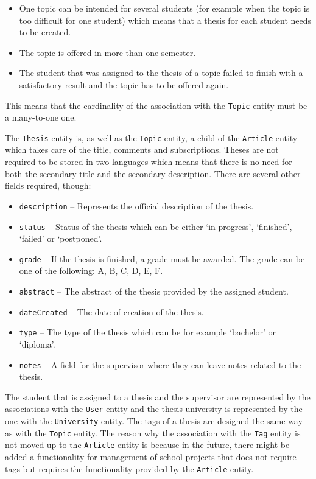 \begin{itemize}
    \item One topic can be intended for several students (for example when the topic is too difficult for one student) which means that a thesis for each student needs to be created.
    \item The topic is offered in more than one semester.
    \item The student that was assigned to the thesis of a topic failed to finish with a satisfactory result and the topic has to be offered again.
\end{itemize}

This means that the cardinality of the association with the \texttt{Topic} entity must be a many-to-one one.

The \texttt{Thesis} entity is, as well as the \texttt{Topic} entity, a child of the \texttt{Article} entity which takes care of the title, comments and subscriptions. Theses are not required to be stored in two languages which means that there is no need for both the secondary title and the secondary description. There are several other fields required, though:

\begin{itemize}
    \item \texttt{description} -- Represents the official description of the thesis.
    \item \texttt{status} -- Status of the thesis which can be either `in progress', `finished', `failed' or `postponed'.
    \item \texttt{grade} -- If the thesis is finished, a grade must be awarded. The grade can be one of the following: A, B, C, D, E, F.
    \item \texttt{abstract} -- The abstract of the thesis provided by the assigned student.
    \item \texttt{dateCreated} -- The date of creation of the thesis.
    \item \texttt{type} -- The type of the thesis which can be for example `bachelor' or `diploma'.
    \item \texttt{notes} -- A field for the supervisor where they can leave notes related to the thesis.
\end{itemize}

The student that is assigned to a thesis and the supervisor are represented by the associations with the \texttt{User} entity and the thesis university is represented by the one with the \texttt{University} entity. The tags of a thesis are designed the same way as with the \texttt{Topic} entity. The reason why the association with the \texttt{Tag} entity is not moved up to the \texttt{Article} entity is because in the future, there might be added a functionality for management of school projects that does not require tags but requires the functionality provided by the \texttt{Article} entity.

